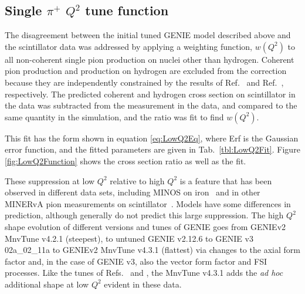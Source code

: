 \documentclass[aps,preprint,showpacs,superscriptaddress,letterpaper,showkeys,superscriptaddress,nofootinbib,floatfix]{revtex4-1}
\newcommand{\secondReviewAdd}[1]{{\bf\color{purple} \protect #1}}
\newcommand{\firstRefereeAdd}[1]{{\bf\color{green} \protect #1}}
\newcommand{\firstRefereeStrike}[1]{{\bf\color{green}\protect \sout{#1}}}
\renewcommand{\secondReviewAdd}[1]{\protect #1}
\renewcommand{\firstRefereeAdd}[1]{\protect #1}
\renewcommand{\firstRefereeStrike}[1]{}
\begin{document}
\subsection{Single $\pi^+$ $Q^2$ tune function}
\label{section:LowQ2Tune}
The disagreement between the initial tuned GENIE model described above and the scintillator data was addressed by applying a weighting function, $w(Q^2)$ to all non-coherent single pion production on nuclei other than hydrogen.   Coherent pion production and production on hydrogen are excluded from the correction because they are independently constrained by the results of Ref.~\cite{AlexCoherent} and Ref.~\cite{Rodrigues:2016xjj}, respectively. The predicted coherent and hydrogen cross section on scintillator in the data was subtracted from the measurement in the data, and compared to the same quantity in the simulation, and the ratio was fit to find $w(Q^2)$. 

This fit has the form shown in equation \ref{eq:LowQ2Eq}, where Erf is the Gaussian error function, and the fitted parameters are given in Tab.~\ref{tbl:LowQ2Fit}.  Figure \ref{fig:LowQ2Function} shows the cross section ratio as well as the fit.

\secondReviewAdd{These suppression at low $Q^2$ relative to high $Q^2$ is a feature that has been observed in different data sets, including MINOS on iron~\cite{MINOS:2014axb} and in other MINERvA pion measurements on scintillator~\cite{Stowell:2019zsh,Eberly:2014mra, McGivern:2016bwh, Altinok:2017xua}.  Models have some differences in prediction, although generally do not predict this large suppression.  The high $Q^2$ shape evolution of different versions and tunes of GENIE goes from GENIE\firstRefereeAdd{v2 MnvTune} v4.2.1 (steepest), to untuned GENIE v2.12.6 to GENIE v3 \firstRefereeAdd{02a\_02\_11a} to GENIE\firstRefereeAdd{v2 MnvTune} v4.3.1 (flattest) via changes to the axial form factor and, in the case of GENIE v3, also the vector form factor and \firstRefereeStrike{well as} FSI processes. Like the tunes of Refs.~\onlinecite{Stowell:2019zsh} and \onlinecite{MINOS:2014axb}, the \firstRefereeAdd{Mnv}Tune v4.3.1 adds the {\em ad hoc} additional shape at low $Q^2$ evident in these data.}
\end{document}
